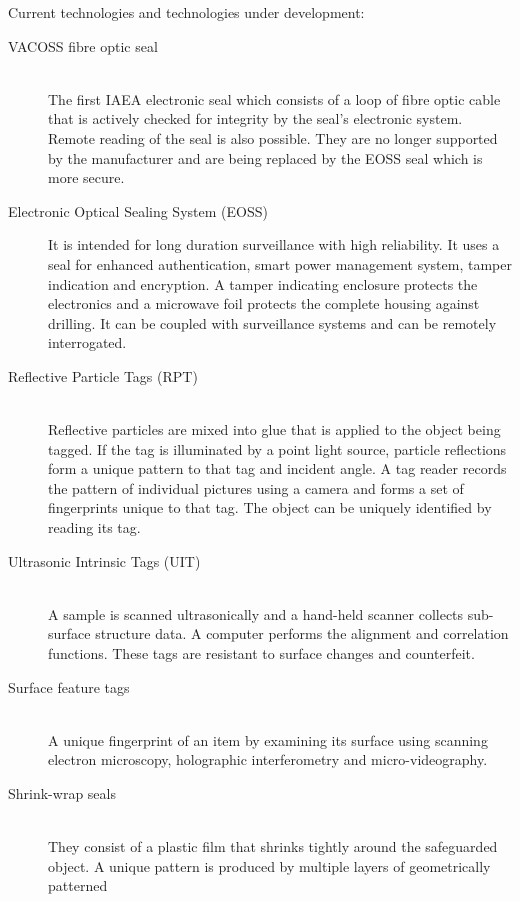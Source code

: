 \documentclass[twoside,titlepage,11pt,twocolumn,a4paper]{article}
\begin{document}
Current technologies and technologies under development:
\citep{zarimpas2003} 
\begin{description}
  \item[VACOSS fibre optic seal] \hfill \\ The first IAEA electronic
    seal which consists of a loop of fibre optic cable that is
    actively checked for integrity by the seal’s electronic
    system. Remote reading of the seal is also possible. They are no
    longer supported by the manufacturer and are being replaced by the
    EOSS seal which is more secure. \citep{IAEAsafeguards2011}
  \item[Electronic Optical Sealing System (EOSS)] It is
    intended for long duration surveillance with high reliability. It
    uses a seal for enhanced authentication, smart power management
    system, tamper indication and encryption. A tamper indicating
    enclosure protects the electronics and a microwave foil protects
    the complete housing against drilling. It can be coupled with
    surveillance systems and can be remotely
    interrogated. \citep{IAEAsafeguards2011}
  \item[Reflective Particle Tags (RPT)] \hfill \\ Reflective particles
    are mixed into glue that is applied to the object being tagged. If
    the tag is illuminated by a point light source, particle
    reflections form a unique pattern to that tag and incident
    angle. A tag reader records the pattern of individual pictures
    using a camera and forms a set of fingerprints unique to that
    tag. The object can be uniquely identified by reading its
    tag. \citep{ellis2007}
  \item[Ultrasonic Intrinsic Tags (UIT)] \hfill \\ A sample is scanned
    ultrasonically and a hand-held scanner collects sub-surface
    structure data. A computer performs the alignment and correlation
    functions. These tags are resistant to surface changes and
    counterfeit.
  \item[Surface feature tags] \hfill \\ A unique fingerprint of an
    item by examining its surface using scanning electron microscopy,
    holographic interferometry and micro-videography.
  \item[Shrink-wrap seals] \hfill \\ They consist of a plastic film
    that shrinks tightly around the safeguarded object. A unique
    pattern is produced by multiple layers of geometrically patterned

\end{description}
\end{document}
